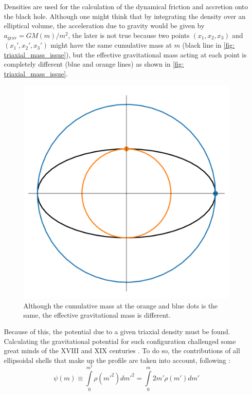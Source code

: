 		Densities are used for the calculation of the dynamical friction and accretion onto the black hole. Although one might think that by integrating the density over an elliptical volume, the acceleration due to gravity would be given by $a_\text{grav} = GM(m)/m^2$, the later is not true because two points $(x_1, x_2, x_3)$ and $(x_1', x_2', x_3')$ might have the same cumulative mass at $m$ (black line in \autoref{fig: triaxial_mass_issue}), but the effective gravitational mass acting at each point is completely different (blue and orange lines) as shown in \autoref{fig: triaxial_mass_issue}.
		\begin{figure}[h]
			\centering
			\includegraphics[width = 0.4\linewidth]{"../Files/Week 7/triaxial_mass_issue"}
			\caption{Although the cumulative mass at the orange and blue dots is the same, the effective gravitational mass is different.}
			\label{fig: triaxial_mass_issue}
		\end{figure}
	
		Because of this, the potential due to a given triaxial density must be found. Calculating the gravitational potential for such configuration challenged some great minds of the XVIII and XIX centuries \cite{binney2011galactic}. To do so, the contributions of all ellipsoidal shells that make up the profile are taken into account, following \citeauthor{binney2011galactic}:
		\begin{equation}
			\psi(m) \equiv \int\limits_{0}^{m^2} \rho(m'^2)dm'^2 = \int\limits_{0}^{m} 2m'\rho(m')dm' 
		\end{equation}
		
